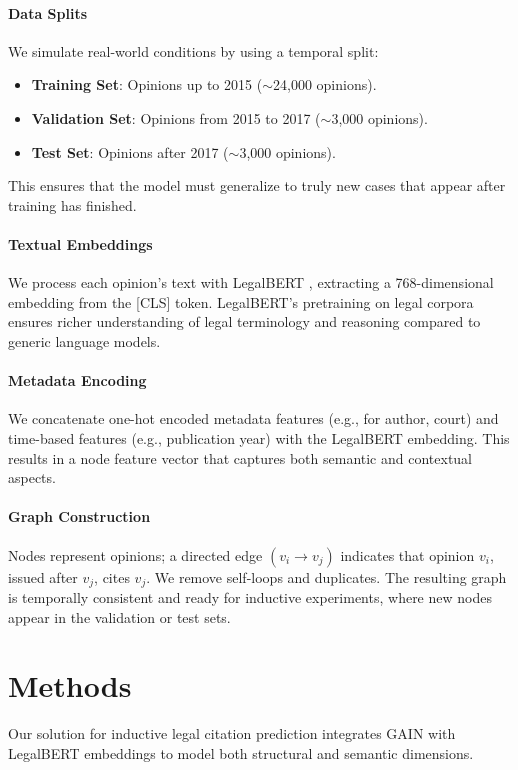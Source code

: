 \documentclass{article}
\begin{document}
\paragraph{Data Splits}
We simulate real-world conditions by using a temporal split:
\begin{itemize}[leftmargin=*]
    \item \textbf{Training Set}: Opinions up to 2015 ($\sim$24,000 opinions).
    \item \textbf{Validation Set}: Opinions from 2015 to 2017 ($\sim$3,000 opinions).
    \item \textbf{Test Set}: Opinions after 2017 ($\sim$3,000 opinions).
\end{itemize}
This ensures that the model must generalize to truly new cases that appear after training has finished.

\paragraph{Textual Embeddings}
We process each opinion’s text with LegalBERT \citep{chalkidis-etal-2020-legalbert}, extracting a 768-dimensional embedding from the [CLS] token. LegalBERT’s pretraining on legal corpora ensures richer understanding of legal terminology and reasoning compared to generic language models.

\paragraph{Metadata Encoding}
We concatenate one-hot encoded metadata features (e.g., for author, court) and time-based features (e.g., publication year) with the LegalBERT embedding. This results in a node feature vector that captures both semantic and contextual aspects.

\paragraph{Graph Construction}
Nodes represent opinions; a directed edge $(v_i \to v_j)$ indicates that opinion $v_i$, issued after $v_j$, cites $v_j$. We remove self-loops and duplicates. The resulting graph is temporally consistent and ready for inductive experiments, where new nodes appear in the validation or test sets.

\section{Methods}
Our solution for inductive legal citation prediction integrates GAIN \citep{weng2022gain} with LegalBERT embeddings to model both structural and semantic dimensions.
\end{document}
